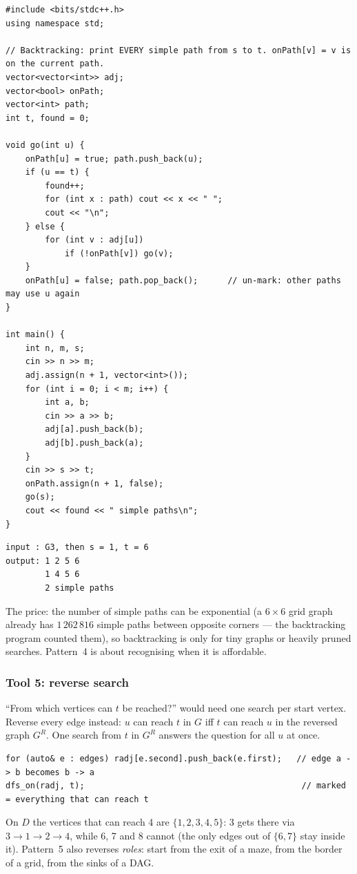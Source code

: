\begin{lstlisting}[style=cpp]
#include <bits/stdc++.h>
using namespace std;

// Backtracking: print EVERY simple path from s to t. onPath[v] = v is on the current path.
vector<vector<int>> adj;
vector<bool> onPath;
vector<int> path;
int t, found = 0;

void go(int u) {
    onPath[u] = true; path.push_back(u);
    if (u == t) {
        found++;
        for (int x : path) cout << x << " ";
        cout << "\n";
    } else {
        for (int v : adj[u])
            if (!onPath[v]) go(v);
    }
    onPath[u] = false; path.pop_back();      // un-mark: other paths may use u again
}

int main() {
    int n, m, s;
    cin >> n >> m;
    adj.assign(n + 1, vector<int>());
    for (int i = 0; i < m; i++) {
        int a, b;
        cin >> a >> b;
        adj[a].push_back(b);
        adj[b].push_back(a);
    }
    cin >> s >> t;
    onPath.assign(n + 1, false);
    go(s);
    cout << found << " simple paths\n";
}
\end{lstlisting}

\begin{lstlisting}[style=trace]
input : G3, then s = 1, t = 6
output: 1 2 5 6
        1 4 5 6
        2 simple paths
\end{lstlisting}

The price: the number of simple paths can be exponential (a $6 \times 6$ grid graph already has $1\,262\,816$ simple paths between opposite corners --- the backtracking program counted them), so backtracking is only for tiny graphs or heavily pruned searches. Pattern~4 is about recognising when it is affordable.

\subsubsection*{Tool 5: reverse search}

``From which vertices can $t$ be reached?'' would need one search per start vertex. Reverse every edge instead: $u$ can reach $t$ in $G$ iff $t$ can reach $u$ in the reversed graph $G^R$. One search from $t$ in $G^R$ answers the question for all $u$ at once.
\begin{lstlisting}[style=snippet]
for (auto& e : edges) radj[e.second].push_back(e.first);   // edge a -> b becomes b -> a
dfs_on(radj, t);                                            // marked = everything that can reach t
\end{lstlisting}
On $D$ the vertices that can reach 4 are $\{1, 2, 3, 4, 5\}$: 3 gets there via $3 \to 1 \to 2 \to 4$, while 6, 7 and 8 cannot (the only edges out of $\{6, 7\}$ stay inside it). Pattern~5 also reverses \emph{roles}: start from the exit of a maze, from the border of a grid, from the sinks of a DAG.

